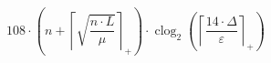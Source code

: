 \[108 \cdot \left(n + \left\lceil \sqrt{\frac{n \cdot L}{\mu}} \right\rceil_{+}\right) \cdot \operatorname{clog}_{2}\left(\left\lceil \frac{14 \cdot \Delta}{\varepsilon} \right\rceil_{+}\right)\]
